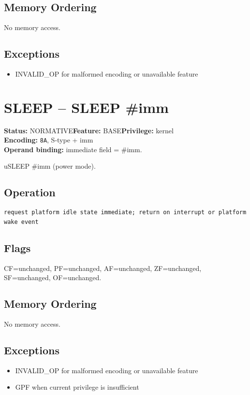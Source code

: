 \documentclass[10pt]{article}
\begin{document}
\subsection*{Memory Ordering}
No memory access.
\subsection*{Exceptions}
\begin{itemize}
\item INVALID\_OP for malformed encoding or unavailable feature
\end{itemize}
\clearpage

\section{SLEEP -- SLEEP \#imm}
\textbf{Status:} NORMATIVE\quad \textbf{Feature:} BASE\quad \textbf{Privilege:} kernel\\
\textbf{Encoding:} \texttt{8A}, S-type + imm\\
\textbf{Operand binding:} immediate field = \#imm.

uSLEEP \#imm (power mode).

\subsection*{Operation}
\begin{lstlisting}
request platform idle state immediate; return on interrupt or platform wake event
\end{lstlisting}
\subsection*{Flags}
CF=unchanged, PF=unchanged, AF=unchanged, ZF=unchanged, SF=unchanged, OF=unchanged.
\subsection*{Memory Ordering}
No memory access.
\subsection*{Exceptions}
\begin{itemize}
\item INVALID\_OP for malformed encoding or unavailable feature
\item GPF when current privilege is insufficient
\end{itemize}
\clearpage
\end{document}
